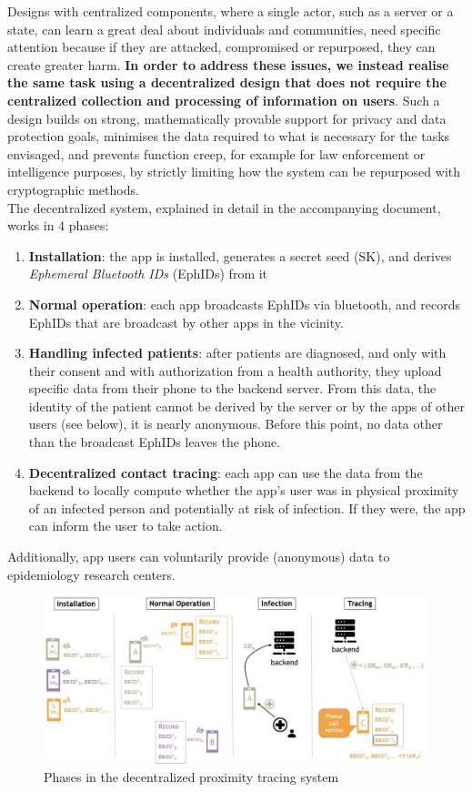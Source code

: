 \documentclass[12pt,a4paper]{article}
\begin{document}
Designs with centralized components, where a single actor, such as a server or a state, can learn a great deal about individuals and communities, need specific attention because if they are attacked, compromised or repurposed, they can create greater harm. \textbf{In order to address these issues, we instead realise the same task using a decentralized design that does not require the centralized collection and processing of information on users}. Such a design builds on strong, mathematically provable support for privacy and data protection goals, minimises the data required to what is necessary for the tasks envisaged, and prevents function creep, for example for law enforcement or intelligence purposes, by strictly limiting how the system can be repurposed with cryptographic methods.\\[0.5cm]
The decentralized system, explained in detail in the accompanying document, works in 4
phases:
\begin{enumerate}\itemsep0pt
\item \textbf{Installation}: the app is installed, generates a secret seed (SK), and derives \textit{Ephemeral Bluetooth IDs} (EphIDs) from it
\item \textbf{Normal operation}: each app broadcasts EphIDs via bluetooth, and records EphIDs that are broadcast by other apps in the vicinity.
\item \textbf{Handling infected patients}: after patients are diagnosed, and only with their consent and with authorization from a health authority, they upload specific data from their phone to the backend server. From this data, the identity of the patient cannot
be derived by the server or by the apps of other users (see below), it is nearly
anonymous. Before this point, no data other than the broadcast EphIDs leaves the
phone.
\item \textbf{Decentralized contact tracing}: each app can use the data from the backend to locally compute whether the app’s user was in physical proximity of an infected
person and potentially at risk of infection. If they were, the app can inform the user to
take action.
\end{enumerate}
Additionally, app users can voluntarily provide (anonymous) data to epidemiology research
centers.
\begin{figure}
\centering
\includegraphics[scale=0.35]{fig/tracing_system}
\caption{Phases in the decentralized proximity tracing system}
\label{tracing_system}
\end{figure}
\end{document}
